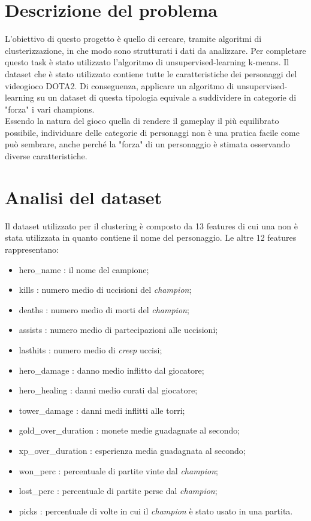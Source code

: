 \documentclass[a4paper,12pt,openany,oneside]{book}
\begin{document}
\section{Descrizione del problema}
L'obiettivo di questo progetto è quello di cercare, tramite algoritmi di clusterizzazione, in che modo sono strutturati i dati da analizzare. Per completare questo task è stato utilizzato l'algoritmo di unsupervised-learning k-means. Il dataset che è stato utilizzato contiene tutte le caratteristiche dei personaggi del videogioco DOTA2. Di conseguenza, applicare un algoritmo di unsupervised-learning su un dataset di questa tipologia equivale a suddividere in categorie di "forza" i vari champions.\\
Essendo la natura del gioco quella di rendere il gameplay il più equilibrato possibile, individuare delle categorie di personaggi non è una pratica facile come può sembrare, anche perché la "forza" di un personaggio è stimata osservando diverse caratteristiche.
\section{Analisi del dataset}
Il dataset utilizzato per il clustering è composto da 13 features di cui una non è stata utilizzata in quanto contiene il nome del personaggio. Le altre 12 features rappresentano:
\begin{itemize}
	\item hero\_name : il nome del campione;
	\item kills : numero medio di uccisioni del \textit{champion};
	\item deaths : numero medio di morti del \textit{champion};
	\item assists : numero medio di partecipazioni alle uccisioni; 
	\item lasthits : numero medio di \textit{creep} uccisi;
	\item hero\_damage : danno medio inflitto dal giocatore;
	\item hero\_healing : danni medio curati dal giocatore;
	\item tower\_damage : danni medi inflitti alle torri;
	\item gold\_over\_duration : monete medie guadagnate al secondo;
	\item xp\_over\_duration : esperienza media guadagnata al secondo;
	\item won\_perc : percentuale di partite vinte dal \textit{champion};
	\item lost\_perc : percentuale di partite perse dal \textit{champion};
	\item picks : percentuale di volte in cui il \textit{champion} è stato usato in una partita.
\end{itemize}
\end{document}
